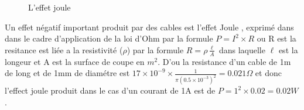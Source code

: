 \documentclass[11pt]{report}
\begin{document}
\begin{figure}
  \begin{center}
    \setlength\fboxsep{0pt}
    \setlength\fboxrule{0.5pt}
  \end{center}
  \caption{L'effet joule}
\end{figure}Un effet négatif important produit par des cables est l'effet Joule , exprimé dans dans le cadre d'application de la loi d'Ohm par la formule \( P=I^{2} \times R\) ou R est la resitance est liée a la resistivité (\(\rho\)) par la formule \( R= \rho \frac{\ell}{A} \) dans laquelle \(\ell\) est la longeur et A est la surface de coupe en \(m^2\).
D'ou la resistance d'un cable de 1m de long et de 1mm de diamétre est \(17 \times 10^{-9} \times \frac{1}{\pi (0.5 \times 10^{-3})^{2}} = 0.021 \Omega \) et donc l'effect joule produit dans le cas d'un courant de 1A est de \( P=1^{2} \times 0.02 = 0.02 W\).
\end{document}
